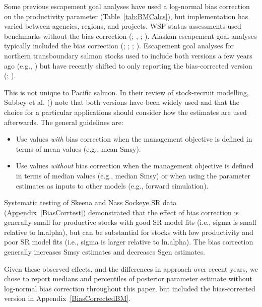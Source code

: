 \documentclass[french,11pt]{book}
\begin{document}
Some previous escapement goal analyses have used a log-normal bias correction on the productivity parameter (Table~\ref{tab:BMCalcs}), but implementation has varied between agencies, regions, and projects. WSP status assessments used benchmarks without the bias correction (; , ; ). Alaskan escapement goal analyses typically included the bias correction (; ; ; ). Escapement goal analyses for northern transboundary salmon stocks used to include both versions a few years ago (e.g., ) but have recently shifted to only reporting the bias-corrected version (; ).

This is not unique to Pacific salmon. In their review of stock-recruit modelling, Subbey et al. () note that both versions have been widely used and that the choice for a particular applications should consider how the estimates are used afterwards. The general guidelines are:
\begin{itemize}

\item
  Use values \emph{with} bias correction when the management objective is defined in terms of mean values (e.g., mean Smsy).
\item
  Use values \emph{without} bias correction when the management objective is defined in terms of median values (e.g., median Smsy) or when using the parameter estimates as inputs to other models (e.g., forward simulation).
\end{itemize}
Systematic testing of Skeena and Nass Sockeye SR data (Appendix~\ref{BiasCorrtest}) demonstrated that the effect of bias correction is generally small for productive stocks with good SR model fits (i.e., sigma is small relative to ln.alpha), but can be substantial for stocks with low productivity and poor SR model fits (i.e., sigma is larger relative to ln.alpha). The bias correction generally increases Smsy estimates and decreases Sgen estimates.

Given these observed effects, and the differences in approach over recent years, we chose to report medians and percentiles of posterior parameter estimate without log-normal bias correction throughout this paper, but included the bias-corrected version in Appendix~\ref{BiasCorrectedBM}.
\end{document}

